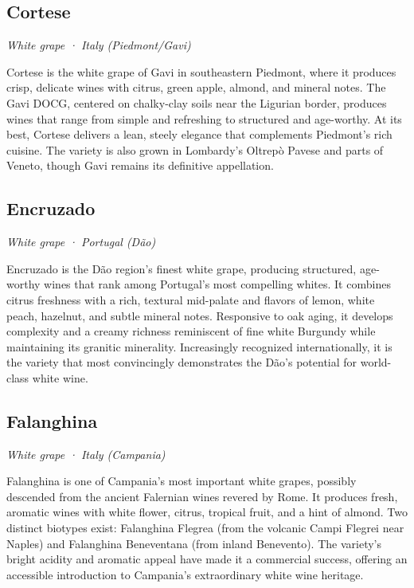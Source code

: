 \subsection*{Cortese}
\textit{White grape · Italy (Piedmont/Gavi)}\par\smallskip

Cortese is the white grape of Gavi in southeastern Piedmont, where it produces crisp, delicate wines with citrus, green apple, almond, and mineral notes. The Gavi DOCG, centered on chalky-clay soils near the Ligurian border, produces wines that range from simple and refreshing to structured and age-worthy. At its best, Cortese delivers a lean, steely elegance that complements Piedmont’s rich cuisine. The variety is also grown in Lombardy’s Oltrepò Pavese and parts of Veneto, though Gavi remains its definitive appellation.

\subsection*{Encruzado}
\textit{White grape · Portugal (Dão)}\par\smallskip

Encruzado is the Dão region’s finest white grape, producing structured, age-worthy wines that rank among Portugal’s most compelling whites. It combines citrus freshness with a rich, textural mid-palate and flavors of lemon, white peach, hazelnut, and subtle mineral notes. Responsive to oak aging, it develops complexity and a creamy richness reminiscent of fine white Burgundy while maintaining its granitic minerality. Increasingly recognized internationally, it is the variety that most convincingly demonstrates the Dão’s potential for world-class white wine.

\subsection*{Falanghina}
\textit{White grape · Italy (Campania)}\par\smallskip

Falanghina is one of Campania’s most important white grapes, possibly descended from the ancient Falernian wines revered by Rome. It produces fresh, aromatic wines with white flower, citrus, tropical fruit, and a hint of almond. Two distinct biotypes exist: Falanghina Flegrea (from the volcanic Campi Flegrei near Naples) and Falanghina Beneventana (from inland Benevento). The variety’s bright acidity and aromatic appeal have made it a commercial success, offering an accessible introduction to Campania’s extraordinary white wine heritage.

